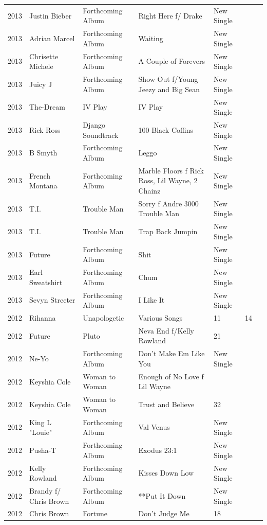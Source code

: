\documentclass{article}
\begin{document}
\begin{tabular}{lllllll}
2013 & Justin Bieber & Forthcoming Album & Right Here f/ Drake & New Single &  &  \\
2013 & Adrian Marcel & Forthcoming Album & Waiting & New Single &  &  \\
2013 & Chrisette Michele & Forthcoming Album & A Couple of Forevers & New Single &  &  \\
2013 & Juicy J & Forthcoming Album & Show Out f/Young Jeezy and Big Sean & New Single &  &  \\
2013 & The-Dream & IV Play & IV Play & New Single &  &  \\
2013 & Rick Ross & Django Soundtrack & 100 Black Coffins & New Single &  &  \\
2013 & B Smyth & Forthcoming Album & Leggo & New Single &  &  \\
2013 & French Montana & Forthcoming Album & Marble Floors f Rick Ross, Lil Wayne, 2 Chainz & New Single &  &  \\
2013 & T.I. & Trouble Man & Sorry f Andre 3000 Trouble Man & New Single &  &  \\
2013 & T.I. & Trouble Man & Trap Back Jumpin & New Single &  &  \\
2013 & Future & Forthcoming Album & Shit & New Single &  &  \\
2013 & Earl Sweatshirt & Forthcoming Album & Chum & New Single &  &  \\
2013 & Sevyn Streeter & Forthcoming Album & I Like It & New Single &  &  \\
2012 & Rihanna & Unapologetic & Various Songs & 11 & 14 &  \\
2012 & Future & Pluto & Neva End f/Kelly Rowland & 21 &  &  \\
2012 & Ne-Yo & Forthcoming Album & Don't Make Em Like You & New Single &  &  \\
2012 & Keyshia Cole & Woman to Woman & Enough of No Love f Lil Wayne &  &  &  \\
2012 & Keyshia Cole & Woman to Woman & Trust and Believe & 32 &  &  \\
2012 & King L "Louie" & Forthcoming Album & Val Venus & New Single &  &  \\
2012 & Pusha-T & Forthcoming Album & Exodus 23:1 & New Single &  &  \\
2012 & Kelly Rowland & Forthcoming Album & Kisses Down Low & New Single &  &  \\
2012 & Brandy f/ Chris Brown & Forthcoming Album & **Put It Down & New Single &  &  \\
2012 & Chris Brown & Fortune & Don't Judge Me & 18 &  &  \\

\end{tabular}
\end{document}
